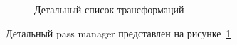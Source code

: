 \begin{figure}[ht]
    \caption{Детальный список трансформаций}\label{fig:passmgr}
\end{figure}

Детальный pass manager представлен на рисунке~\cref{fig:passmgr}

